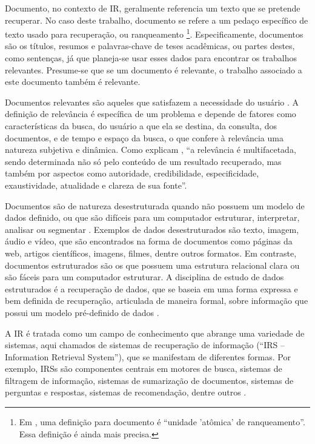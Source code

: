 \documentclass[
	12pt,				%
	openright,			%
	oneside,			%
	a4paper,			%
	english,			%
	french,				%
	spanish,			%
	brazil				%
	]{abntex2}
\begin{document}
Documento, no contexto de IR, geralmente referencia um texto que se pretende recuperar.
No caso deste trabalho, documento se refere a um pedaço específico de texto usado para recuperação, ou ranqueamento
\footnote{Em \citeauthor{bible}, uma definição para documento é ``unidade 'atômica' de ranqueamento''. Essa definição é ainda mais precisa.}.
Especificamente, documentos são os títulos, resumos e palavras-chave de teses acadêmicas, ou partes destes, como sentenças, já que planeja-se usar esses dados para encontrar os trabalhos relevantes.
Presume-se que se um documento é relevante, o trabalho associado a este documento também é relevante.

Documentos relevantes são aqueles que satisfazem a necessidade do usuário \cite{manning2008introduction}.
A definição de relevância é específica de um problema e depende de fatores como
características da busca, do usuário a que ela se destina, da consulta, dos documentos, e de
tempo e espaço da busca, o que confere à relevância uma natureza subjetiva e dinâmica.
Como explicam \citeauthor{Ceri2013}, ``a relevância é multifacetada, sendo determinada não só pelo conteúdo de um
resultado recuperado, mas também por aspectos como autoridade, credibilidade, especificidade, exaustividade,
atualidade e clareza de sua fonte''.

Documentos são de natureza desestruturada quando não possuem um modelo de dados definido, ou que são difíceis para um computador
estruturar, interpretar, analisar ou segmentar \cite{manning2008introduction}.
Exemplos de dados desestruturados são texto, imagem, áudio e vídeo, que são encontrados na forma de
documentos como páginas da web, artigos científicos, imagens, filmes, dentre outros formatos.
Em contraste, documentos estruturados são os que possuem uma estrutura relacional clara ou são fáceis para um computador estruturar.
A disciplina de estudo de dados estruturados é a recuperação de dados, que se baseia em uma forma expressa e bem
definida de recuperação, articulada de maneira formal, sobre informação que possui um modelo pré-definido de dados \cite{JurafskyMartin2023}.

A IR é tratada como um campo de conhecimento que abrange uma variedade de
sistemas, aqui chamados de sistemas de recuperação de informação (``IRS -- Information Retrieval System''), que se manifestam de diferentes formas.
Por exemplo, IRSs são componentes centrais em motores de busca,
sistemas de filtragem de informação, sistemas de sumarização de documentos, sistemas de perguntas e respostas,
sistemas de recomendação, dentre outros \cite{Ceri2013}.
\end{document}
